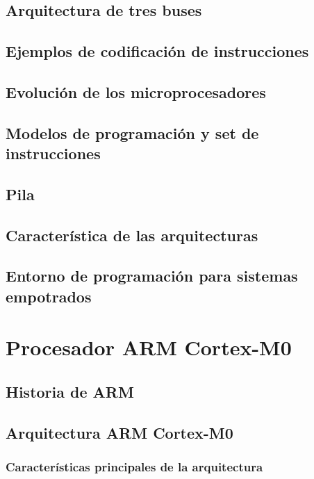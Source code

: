 \documentclass[a4paper]{book}
\begin{document}
\section{Arquitectura de tres buses}

\section{Ejemplos de codificación de instrucciones}

\section{Evolución de los microprocesadores}

\section{Modelos de programación y set de instrucciones}

\section{Pila}

\section{Característica de las arquitecturas}

\section{Entorno de programación para sistemas empotrados}

\chapter{Procesador ARM Cortex-M0}

\section{Historia de ARM}

\section{Arquitectura ARM Cortex-M0}

\subsection{Características principales de la arquitectura}
\end{document}
